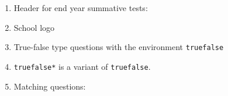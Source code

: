 \documentclass[10pt,a4page]{article}
\def\cellwidth{0.4\textwidth}
\newcommand{\miniexample}[3][t]{%
  \parbox[#1][#3][t]{\cellwidth}{#2}
}
\newcommand{\codeexample}[3][c]{%
  \colorbox[HTML]{b0c4be}{\miniexample[#1]{}{#3}}
}
\newcommand{\textexample}[3][c]{%
  {\footnotesize
    \colorbox[gray]{0.9}{\miniexample[#1]{}{#3}}%
  }
}
\newcommand{\examplerow}[3][10pt]{%
  \par\noindent\strut\hfill\codeexample{#2}{#3}\hspace{#1}\textexample{#2}{#3}\hfill\strut
}
\newlength{\exheight}
\begin{document}
\begin{enumerate}
\item Header for end year summative tests:
  \setlength{\exheight}{30pt}
  \examplerow{exampleMacroFinalExamhd.tex}{\exheight}

\item School logo
  \setlength{\exheight}{48pt}
  \examplerow{exampleMacroSchoollogo.tex}{\exheight}

\item True-false type questions with the environment \verb|truefalse|\\
  \setlength{\exheight}{68pt}
  \setlength{\truefalselength}{20pt}
  \examplerow{exampleEnvirTruefalse01.tex}{\exheight}

\item \verb|truefalse*| is a variant of \verb|truefalse|.
  \setlength{\exheight}{68pt}
  \examplerow{exampleEnvirTruefalse02.tex}{\exheight}

\item Matching questions:
  \setlength{\exheight}{98pt}
  \examplerow{exampleMacroMatchingque.tex}{\exheight}
\end{enumerate}
\end{document}

